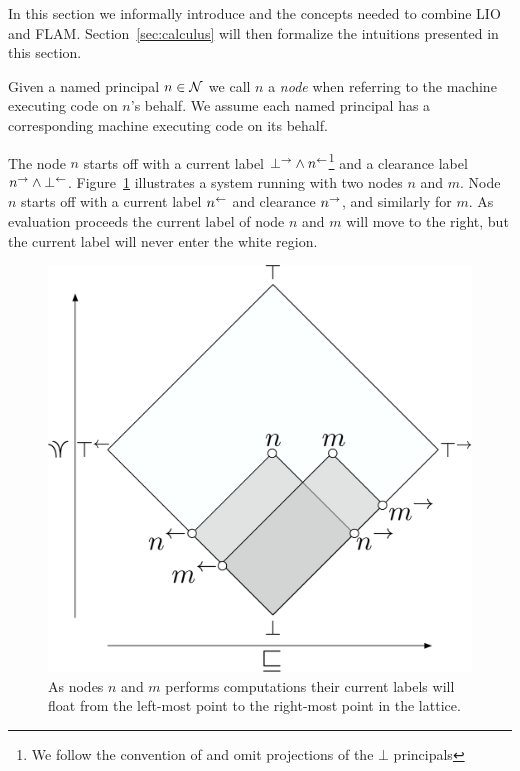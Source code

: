 In this section we informally introduce \lang{} and the concepts needed to combine LIO and FLAM. Section~\ref{sec:calculus} will then formalize the intuitions presented in this section.

Given a named principal $n \in \mathcal{N}$ we call $n$ a \emph{node} when referring to the machine executing code on $n$'s behalf. We assume each named principal has a corresponding machine executing code on its behalf.

The node $n$ starts off with a current label $\bot^{\rightarrow} \wedge n^{\leftarrow}$\footnote{We follow the convention of \cite{Arden:2015:FA:2859845.2859998} and omit projections of the $\bot$ principals} and a clearance label $n^{\rightarrow} \wedge \bot^{\leftarrow}$. Figure~\ref{fig:node-info-flow} illustrates a system running \lang{} with two nodes $n$ and $m$. Node $n$ starts off with a current label $n^{\leftarrow}$ and clearance $n^{\rightarrow}$, and similarly for $m$. As evaluation proceeds the current label of node $n$ and $m$ will move to the right, but the current label will never enter the white region.

\begin{figure}
    \centering
    \includegraphics[scale=0.25]{Illustrations/multi-node.pdf}
    \caption{As nodes $n$ and $m$ performs computations their current labels will float from the left-most point to the right-most point in the lattice.}
    \label{fig:node-info-flow}
\end{figure}

